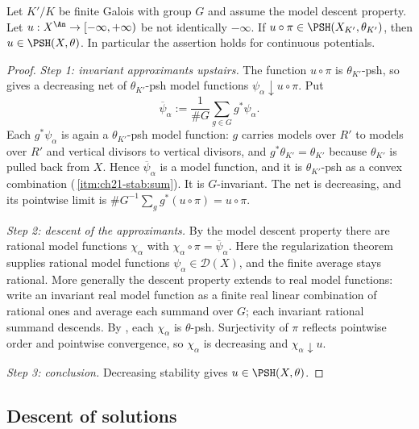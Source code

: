 \begin{theorem}
\label{thm:ch30-continuous-descent}
Let $K'/K$ be finite Galois with group $G$ and assume the model descent
property.  Let
$u:X^{\An}\to[-\infty,+\infty)$ be not identically $-\infty$.  If
$u\circ\pi\in\PSH(X_{K'},\theta_{K'})$, then
$u\in\PSH(X,\theta)$.  In particular the assertion holds for continuous
potentials.
\end{theorem}

\begin{proof}
\emph{Step 1: invariant approximants upstairs.}  The function
$u\circ\pi$ is $\theta_{K'}$-psh, so
 gives a decreasing net of
$\theta_{K'}$-psh model functions
$\psi_\alpha\downarrow u\circ\pi$.  Put
\[
 \overline\psi_\alpha:=\frac1{\#G}\sum_{g\in G}g^*\psi_\alpha .
\]
Each $g^*\psi_\alpha$ is again a $\theta_{K'}$-psh model function: $g$
carries models over $R'$ to models over $R'$ and vertical divisors to
vertical divisors, and $g^*\theta_{K'}=\theta_{K'}$ because
$\theta_{K'}$ is pulled back from $X$.  Hence
$\overline\psi_\alpha$ is a
model function, and it is $\theta_{K'}$-psh as a convex combination
(\,\cref{itm:ch21-stab:sum}).  It is
$G$-invariant.  The net is decreasing, and its pointwise limit is
$\#G^{-1}\sum_g g^*(u\circ\pi)=u\circ\pi$.

\emph{Step 2: descent of the approximants.}  By the model descent property
there are rational model functions
$\chi_\alpha$ with $\chi_\alpha\circ\pi=\overline\psi_\alpha$.
Here the regularization theorem supplies rational model functions
$\psi_\alpha\in\mathcal D(X)$, and the finite average stays rational.
More generally the descent property extends to real model functions:
write an invariant real model function as a finite real linear
combination of rational ones and average each summand over $G$;
each invariant rational summand descends.  By
, each $\chi_\alpha$ is $\theta$-psh.
Surjectivity of $\pi$ reflects pointwise order and pointwise convergence,
so $\chi_\alpha$ is decreasing and $\chi_\alpha\downarrow u$.

\emph{Step 3: conclusion.}  Decreasing stability
 gives
$u\in\PSH(X,\theta)$.
\end{proof}

\subsection{Descent of solutions}
\label{sec:ch30-descent-solutions}

